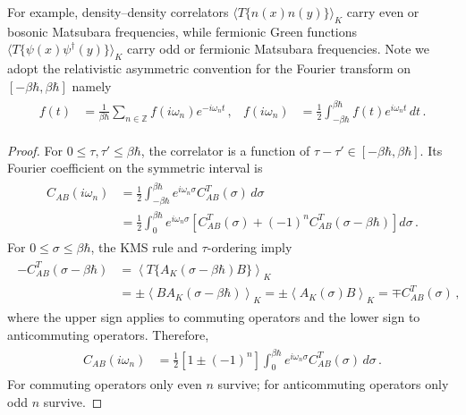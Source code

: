 \documentclass[../QFT_main.tex]{subfiles}
\begin{document}
\begin{mytheorem}
{\begin{align}
\begin{aligned}
\end{aligned}\end{align}}
For example, density--density correlators $\langle T\{n(x)n(y)\}\rangle_K$ carry even or bosonic Matsubara frequencies, while fermionic Green functions $\langle T\{\psi(x)\psi^\dagger(y)\}\rangle_K$ carry odd or fermionic Matsubara frequencies.
Note we adopt the relativistic asymmetric convention for the Fourier transform on $[-\beta\hbar,\beta\hbar]$ namely
{\small\begin{align}\begin{aligned}
    f(t)
    &=\tfrac{1}{\beta\hbar}
    \sum_{n\in\mathbb Z}
    f(i\omega_n)e^{-i\omega_n t}\,,
    &
    f(i\omega_n)
    &=
    \tfrac12\int_{-\beta\hbar}^{\beta\hbar}
    f(t)e^{i\omega_n t}\,dt\,.
\end{aligned}\end{align}}
\end{mytheorem}
\begin{proof}
For $0\leq\tau,\tau'\leq\beta\hbar$, the correlator is a function of $\tau-\tau'\in[-\beta\hbar,\beta\hbar]$.
Its Fourier coefficient on the symmetric interval is
{\small\begin{align}\begin{aligned}
    C_{AB}(i\omega_n)
    &=
    \tfrac12\int_{-\beta\hbar}^{\beta\hbar}
    e^{i\omega_n\sigma}C_{AB}^{T}(\sigma)\,d\sigma
    \\
    &=
    \tfrac12\int_0^{\beta\hbar}
    e^{i\omega_n\sigma}
    \left[
        C_{AB}^{T}(\sigma)
        +(-1)^n C_{AB}^{T}(\sigma-\beta\hbar)
    \right]d\sigma\,.
\end{aligned}\end{align}}
For $0\leq\sigma\leq\beta\hbar$, the KMS rule and $\tau$-ordering imply
{\small\begin{align}\begin{aligned}
    -C_{AB}^{T}(\sigma-\beta\hbar)
    &=
    \left\langle T\{A_K(\sigma-\beta\hbar)B\}\right\rangle_K
    \\
    &=
    \pm\left\langle BA_K(\sigma-\beta\hbar)\right\rangle_K
    =
    \pm\left\langle A_K(\sigma)B\right\rangle_K
    =
    \mp C_{AB}^{T}(\sigma)\,,
\end{aligned}\end{align}}
where the upper sign applies to commuting operators and the lower sign to anticommuting operators.
Therefore,
{\small\begin{align}\begin{aligned}
    C_{AB}(i\omega_n)
    &=
    \tfrac12\left[1\pm(-1)^n\right]
    \int_0^{\beta\hbar}
    e^{i\omega_n\sigma}C_{AB}^{T}(\sigma)\,d\sigma\,.
\end{aligned}\end{align}}
For commuting operators only even $n$ survive; for anticommuting operators only odd $n$ survive.
\end{proof}
\end{document}
